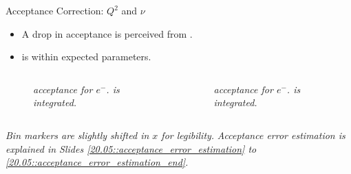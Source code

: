\begin{frame}{Acceptance Correction: $Q^2$ and $\nu$}
    \label{11.52::electron_variables}

    \begin{itemize}
        \item
            A drop in  acceptance is perceived from .

        \item
            \ef{$\nu$} is within expected parameters.
    \end{itemize}

    \vspace{-12pt}
    \begin{columns}[onlytextwidth,T]

    \begin{column}{.49\linewidth}
        \begin{center}
            \begin{figure}[t]
                \scriptsize{\textit{
                     acceptance for $e^-$.
                    \ef{$\nu$} is integrated.
                }}
            \end{figure}
        \end{center}
    \end{column}

    \begin{column}{.49\linewidth}
        \begin{center}
            \begin{figure}[t]
                \scriptsize{\textit{
                    \ef{$\nu$} acceptance for $e^-$.
                     is integrated.
                }}
            \end{figure}
        \end{center}
    \end{column}

    \end{columns}

    \begin{flushright}
        \tiny{\textit{Bin markers are slightly shifted in $x$ for legibility.}}
        \tiny{\textit{Acceptance error estimation is explained in Slides \textcolor{efd_purple}{\ref{20.05::acceptance_error_estimation}} to \textcolor{efd_purple}{\ref{20.05::acceptance_error_estimation_end}}.}}
    \end{flushright}
\end{frame}

